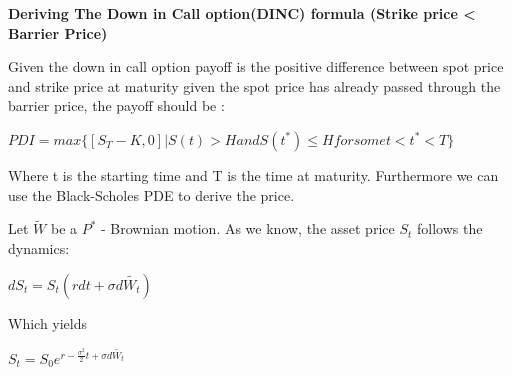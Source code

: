 \documentclass[12pt]{article}
\renewcommand{\_}{\kern-1.5pt\textunderscore\kern-1.5pt}
\begin{document}
\vspace{\baselineskip}

\vspace{\baselineskip}

\vspace{\baselineskip}

\vspace{\baselineskip}

\vspace{\baselineskip}

\vspace{\baselineskip}

\vspace{\baselineskip}

\vspace{\baselineskip}

\vspace{\baselineskip}

\vspace{\baselineskip}
\textbf{Deriving The Down in Call option(DINC) formula (Strike price < Barrier Price)}\par

Given the down in call option payoff is the positive difference between spot price and strike price at maturity given the spot price has already passed through the barrier price, the payoff should be :\par

\begin{Center}
 \( PDI=max⁡ \{ ⁡ \left[ S_{T}-K,0 \right]  \vert S \left( t \right) >H and S \left( t^{\ast} \right)  \leq H for some t<t^{\ast}<T \}  \) 
\end{Center}\par

Where t is the starting time and T is the time at maturity. Furthermore we can use the Black-Scholes PDE to derive the price. \par

Let  \( \widetilde{W} \)  be a  \( P^{\ast} \) - Brownian motion. As we know, the asset price  \( S_{t} \)  follows the dynamics: \par

\begin{Center}
 \( dS_{t}=S_{t} \left( rdt+ \sigma d\widetilde{W_{t}} \right)  \) 
\end{Center}\par

Which yields\par

\begin{Center}
 \( S_{t}=S_{0}e^{r-\frac{ \sigma ^{2}}{2}t+ \sigma d\widetilde{W_{t}}} \) 
\end{Center}\par
\end{document}
